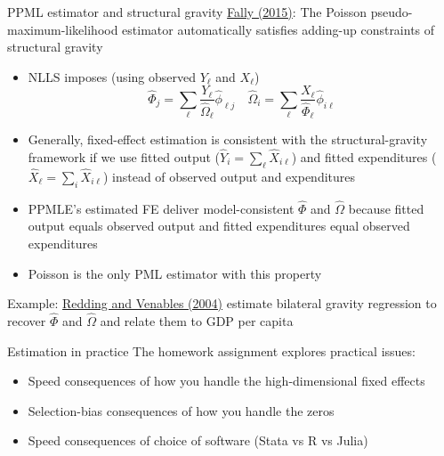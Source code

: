 \documentclass[10pt,notes=hide,aspectratio=169]{beamer}
\begin{document}
\begin{frame}{PPML estimator and structural gravity}
\href{https://doi.org/10.1016/j.jinteco.2015.05.005}{Fally (2015)}:
The Poisson pseudo-maximum-likelihood estimator automatically satisfies adding-up constraints of structural gravity
\begin{itemize}
\item 
NLLS imposes (using observed $Y_{\ell}$ and $X_{\ell}$)
\begin{equation*}
\hat{\Phi}_j = \sum_{\ell} \frac{Y_{\ell}}{\hat{\Omega}_{\ell}} \hat{\phi}_{\ell j}
\quad
\hat{\Omega}_i = \sum_{\ell} \frac{X_{\ell}}{\hat{\Phi}_{\ell}} \hat{\phi}_{i \ell}
\end{equation*}
\item 
Generally, fixed-effect estimation is consistent with the structural-gravity framework
if we use fitted output ($\hat{Y}_{i} = \sum_{\ell} \hat{X}_{i\ell}$) and fitted expenditures ($\hat{X}_{\ell} = \sum_{i} \hat{X}_{i\ell}$)
instead of observed output and expenditures
\item 
PPMLE's estimated FE deliver model-consistent $\hat{\Phi}$ and $\hat{\Omega}$ because
fitted output equals observed output and fitted expenditures equal observed expenditures
\item
Poisson is the only PML estimator with this property
\end{itemize}
Example:
\href{https://ideas.repec.org/a/eee/inecon/v62y2004i1p53-82.html}{Redding and Venables (2004)}
estimate bilateral gravity regression to recover $\hat{\Phi}$ and $\hat{\Omega}$
and relate them to GDP per capita
\end{frame}
\begin{frame}{Estimation in practice}
The homework assignment explores practical issues:
\begin{itemize}
\item Speed consequences of how you handle the high-dimensional fixed effects
\item Selection-bias consequences of how you handle the zeros
\item Speed consequences of choice of software (Stata vs R vs Julia)
\end{itemize}
\end{frame}
\end{document}
